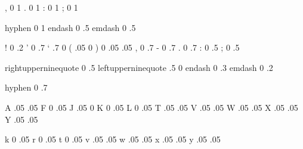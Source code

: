 

\startfonthandling [pure]

   , 0 1
   . 0 1
   : 0 1
   ; 0 1

   hyphen 0 1
   endash 0 .5 
   emdash 0 .5

\stopfonthandling

\startfonthandling [punctuation]

   !  0  .2
   '  0  .7
   ` .7   0
   ( .05  0   
   )  0  .05
    .05
   ,  0  .7
   -  0  .7
   .  0  .7
   :  0  .5
   ;  0  .5

   rightupperninequote  0 .5
   leftupperninequote  .5  0 
   endash               0 .3  
   emdash               0 .2  

   hyphen               0 .7

\stopfonthandling

\startfonthandling [alpha]

   A .05 .05
   F  0  .05
   J .05   0
   K  0  .05  
   L  0  .05
   T .05 .05
   V .05 .05
   W .05 .05
   X .05 .05
   Y .05 .05
  
   k  0  .05 
   r  0  .05
   t  0  .05 
   v .05 .05
   w .05 .05
   x .05 .05
   y .05 .05

